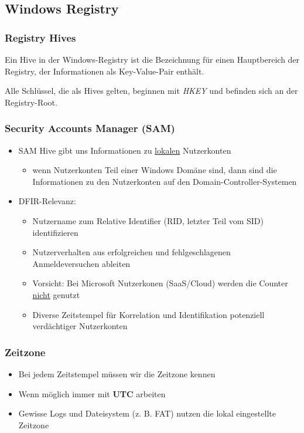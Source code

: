 \subsection{Windows Registry}

\subsubsection{Registry Hives}
Ein Hive in der Windows-Registry ist die Bezeichnung für einen Hauptbereich der Registry, der Informationen als Key-Value-Pair enthält.

Alle Schlüssel, die als Hives gelten, beginnen mit \textit{HKEY} und befinden sich an der Registry-Root.

\subsubsection{Security Accounts Manager (SAM)}
\begin{itemize}
    \item SAM Hive gibt uns Informationen zu \underline{lokalen} Nutzerkonten
    \begin{itemize}
        \item wenn Nutzerkonten Teil einer Windows Domäne sind, dann sind die Informationen zu den Nutzerkonten auf den Domain-Controller-Systemen
    \end{itemize}
    \item DFIR-Relevanz:
    \begin{itemize}
        \item Nutzername zum Relative Identifier (RID, letzter Teil vom SID) identifizieren
        \item Nutzerverhalten aus erfolgreichen und fehlgeschlagenen Anmeldeversuchen ableiten
        \item Vorsicht: Bei Microsoft Nutzerkonen (SaaS/Cloud) werden die Counter \underline{nicht} genutzt
        \item Diverse Zeitstempel für Korrelation und Identifikation potenziell verdächtiger Nutzerkonten
    \end{itemize}
\end{itemize}

\subsubsection{Zeitzone}
\begin{itemize}
    \item Bei jedem Zeitstempel müssen wir die Zeitzone kennen
    \item Wenn möglich immer mit \textbf{UTC} arbeiten
    \item Gewisse Logs und Dateisystem (z. B. FAT) nutzen die lokal eingestellte Zeitzone
\end{itemize}

